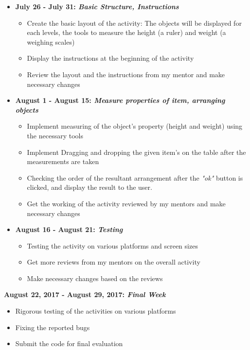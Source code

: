 \documentclass[preprint,12pt]{elsarticle}
\begin{document}
\begin{itemize}

\item \textbf{July 26 - July 31: \textit{Basic Structure, Instructions}}

\begin{itemize}
\item Create the basic layout of the activity: The objects will be displayed for each levels, the tools to measure the height (a ruler) and weight (a weighing scales)
\item Display the instructions at the beginning of the activity
\item Review the layout and the instructions from my mentor and make necessary changes
\end{itemize}

\item \textbf{August 1 - August 15: \textit{Measure properties of item, arranging objects}}

\begin{itemize}
\item Implement measuring of the object's property (height and weight) using the necessary tools
\item Implement Dragging and dropping the given item's on the table after the measurements are taken
\item Checking the order of the resultant arrangement after the \textit{"ok"} button is clicked, and display the result to the user.
\item Get the working of the activity reviewed by my mentors and make necessary changes
\end{itemize}

\item \textbf{August 16 - August 21: \textit{Testing}}

\begin{itemize}
\item Testing the activity on various platforms and screen sizes
\item Get more reviews from my mentors on the overall activity
\item Make necessary changes based on the reviews
\end{itemize}

\end{itemize}

\textbf{August 22, 2017 - August 29, 2017: \textit{Final Week}}

\begin{itemize}
\item Rigorous testing of the activities on various platforms
\item Fixing the reported bugs
\item Submit the code for final evaluation
\end{itemize}
\end{document}
